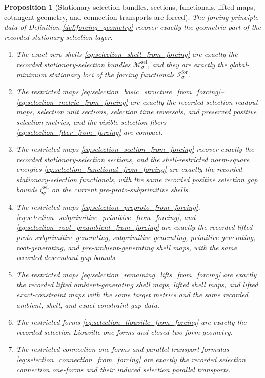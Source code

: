 \documentclass[11pt]{article}
\newcommand{\SelSpace}[1]{\mathcal M_{#1}^{\mathrm{sel}}}
\newcommand{\SelGap}[1]{\zeta_{#1}^{\mathrm{sel}}}
\newcommand{\ForFunctional}[1]{\mathscr I_{#1}^{\mathrm{for}}}
\newtheorem{proposition}{Proposition}
\begin{document}
\begin{proposition}[Stationary-selection bundles, sections, functionals, lifted maps, cotangent geometry, and connection-transports are forced]
\label{prop:selection_geometry_forced}
The forcing-principle data of Definition \ref{def:forcing_geometry} recover exactly the geometric part of the recorded stationary-selection layer.
\begin{enumerate}
    \item The exact zero shells \eqref{eq:selection_shell_from_forcing} are exactly the recorded stationary-selection bundles \(\SelSpace{\sigma}\), and they are exactly the global-minimum stationary loci of the forcing functionals \(\ForFunctional{\sigma}\).
    \item The restricted maps \eqref{eq:selection_basic_structure_from_forcing}--\eqref{eq:selection_metric_from_forcing} are exactly the recorded selection readout maps, selection unit sections, selection time reversals, and preserved positive selection metrics, and the visible selection fibers \eqref{eq:selection_fiber_from_forcing} are compact.
    \item The restricted maps \eqref{eq:selection_section_from_forcing} recover exactly the recorded stationary-selection sections, and the shell-restricted norm-square energies \eqref{eq:selection_functional_from_forcing} are exactly the recorded stationary-selection functionals, with the same recorded positive selection gap bounds \(\SelGap{\sigma}\) on the current pre-proto-subprimitive shells.
    \item The restricted maps \eqref{eq:selection_preproto_from_forcing}, \eqref{eq:selection_subprimitive_primitive_from_forcing}, and \eqref{eq:selection_root_preambient_from_forcing} are exactly the recorded lifted proto-subprimitive-generating, subprimitive-generating, primitive-generating, root-generating, and pre-ambient-generating shell maps, with the same recorded descendant gap bounds.
    \item The restricted maps \eqref{eq:selection_remaining_lifts_from_forcing} are exactly the recorded lifted ambient-generating shell maps, lifted shell maps, and lifted exact-constraint maps with the same target metrics and the same recorded ambient, shell, and exact-constraint gap data.
    \item The restricted forms \eqref{eq:selection_liouville_from_forcing} are exactly the recorded selection Liouville one-forms and closed two-form geometry.
    \item The restricted connection one-forms and parallel-transport formulas \eqref{eq:selection_connection_from_forcing} are exactly the recorded selection connection one-forms and their induced selection parallel transports.

\end{enumerate}
\end{proposition}
\end{document}

